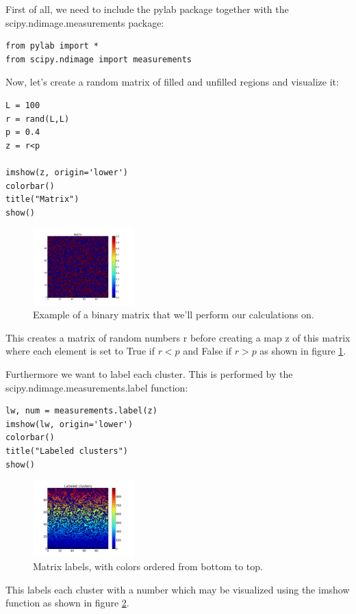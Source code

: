 \documentclass[a4paper,reprint,floatfix,amsmath,amssymb,aps,pra]{revtex4-1}
\begin{document}
First of all, we need to include the pylab package together with the scipy.ndimage.measurements package:
%
\begin{lstlisting}
from pylab import *
from scipy.ndimage import measurements
\end{lstlisting}
%
Now, let's create a random matrix of filled and unfilled regions and visualize it:

\begin{lstlisting}
L = 100
r = rand(L,L)
p = 0.4
z = r<p

imshow(z, origin='lower')
colorbar()
title("Matrix")
show()
\end{lstlisting}
%
\begin{figure}
  \centering
  \includegraphics[width=0.35\textwidth]{./images/matrix.png}
  \caption{Example of a binary matrix that we'll perform our calculations on.}
  \label{fig:intro-matrix}
\end{figure}

This creates a matrix of random numbers r before creating a map z of this matrix where each element is set to True if $r < p$ and False if $r > p$ as shown in figure \ref{fig:intro-matrix}.

Furthermore we want to label each cluster. This is performed by the scipy.ndimage.measurements.label function:
%
\begin{lstlisting}
lw, num = measurements.label(z)
imshow(lw, origin='lower')
colorbar()
title("Labeled clusters")
show()
\end{lstlisting}
%
\begin{figure}[b]
  \centering
  \includegraphics[width=0.35\textwidth]{./images/labeled-matrix-ordered.png}
  \caption{Matrix labels, with colors ordered from bottom to top.}
  \label{fig:intro-labels}
\end{figure}
%
This labels each cluster with a number which may be visualized using the imshow function as shown in figure \ref{fig:intro-labels}.
\end{document}
